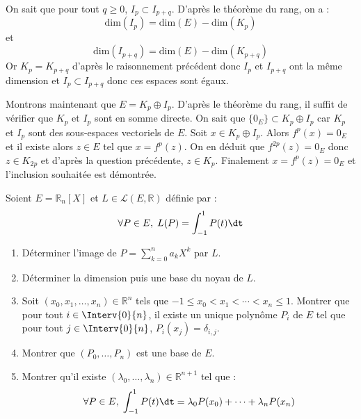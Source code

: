 \documentclass[a4paper,10pt]{report}
\begin{document}
\begin{enumerate}
\medskip

\noindent On sait que pour tout $q \geq 0$, $I_p \subset I_{p+q}$. D'après le théorème du rang, on a :
$$ \textrm{dim}(I_p) = \textrm{dim}(E) - \textrm{dim}(K_p)$$
et 
$$ \textrm{dim}(I_{p+q}) = \textrm{dim}(E) - \textrm{dim}(K_{p+q})$$
Or $K_p = K_{p+q}$ d'après le raisonnement précédent donc $I_p$ et $I_{p+q}$ ont la même dimension et $I_p \subset I_{p+q}$ donc ces espaces sont égaux.

\medskip

\noindent Montrons maintenant que $E = K_p \oplus I_p$. D'après le théorème du rang, il suffit de vérifier que $K_p$ et $I_p$ sont en somme directe. On sait que $\lbrace 0_E \rbrace \subset  K_p \oplus I_p$ car $K_p$ et $I_p$ sont des sous-espaces vectoriels de $E$. Soit $x \in  K_p \oplus I_p$. Alors $f^p(x)=0_E$ et il existe alors $z \in E$ tel que $x=f^p(z)$. On en déduit que $f^{2p}(z)=0_E$ donc $z \in K_{2p}$ et d'après la question précédente, $z \in K_p$. Finalement $x=f^p(z)=0_E$ et l'inclusion souhaitée est démontrée.

\end{enumerate}


\begin{Exercice}{} Soient $E= \mathbb{R}_n[X]$ et $L \in \mathcal{L}(E, \mathbb{R})$ définie par :
$$ \forall P \in E, \;  L(P) = \int_{-1}^1 P(t) \dt$$
\begin{enumerate}
\item Déterminer l'image de $P= \sum_{k=0}^n a_k X^k$ par $L$.
\item Déterminer la dimension puis une base du noyau de $L$.
\item Soit $(x_0, x_1, \ldots, x_n) \in \mathbb{R}^n$ tels que $-1 \leq x_0 < x_1 < \cdots < x_n \leq 1$. Montrer que pour tout $i \in \Interv{0}{n}$, il existe un unique polynôme $P_i$ de $E$ tel que pour tout $j \in \Interv{0}{n}$, $P_i(x_j)= \delta_{i,j}$.
\item Montrer que $(P_0, \ldots, P_n)$ est une base de $E$.
\item Montrer qu'il existe $(\lambda_0, \ldots, \lambda_n) \in \mathbb{R}^{n+1}$ tel que :
$$ \forall P \in E, \; \int_{-1}^1 P(t) \dt = \lambda_0 P(x_0) + \cdots + \lambda_n P(x_n)$$
\end{enumerate}
\end{Exercice}
\end{document}
